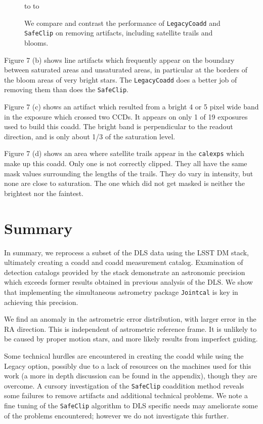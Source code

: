 \documentclass[DM,toc]{lsstdoc}
\def\gridline#1{\vskip6pt\hbox to\hsize{#1}\vskip6pt}
\def\fig#1#2#3{\hfill\vbox{\parskip=0pt\hsize=#2
\texttt{[image: \#1]}\vskip2pt\vtop{\centering
\footnotesize
\hsize=#2
#3\vskip1pt
}}\hfill}
\begin{document}
\begin{figure}
\gridline{\fig{fig1.png}{0.5\textwidth}{(a)}
          \fig{fig2.png}{0.5\textwidth}{(b)}
		}
\gridline{
		\fig{fig3.png}{0.5\textwidth}{(c)}
        \fig{fig5.png}{0.5\textwidth}{(d)}
	}
\caption{We compare and contrast the performance of {\tt\string LegacyCoadd} and {\tt\string SafeClip} on removing artifacts, including satellite trails and blooms.}
\end{figure}

Figure 7 (b) shows line artifacts which frequently appear on the boundary between saturated areas and unsaturated areas, in particular at the borders of the bloom areas of very bright stars. The {\tt\string LegacyCoadd} does a better job of removing them than does the {\tt\string SafeClip}.

Figure 7 (c) shows an artifact which resulted from a bright 4 or 5 pixel wide band in the exposure which crossed two CCDs. It appears on only 1 of 19 exposures used to build this coadd. The bright band is perpendicular to the readout direction, and is only about 1/3 of the saturation level.

Figure 7 (d) shows an area where satellite trails appear in the {\tt\string calexps} which make up this coadd. Only one is not correctly clipped. They all have the same mask values surrounding the lengths of the trails.  They do vary in intensity, but none are close to saturation. The one which did not get masked is neither the brightest nor the faintest.

\section{Summary}
In summary, we reprocess a subset of the DLS data using the LSST DM stack, ultimately creating a coadd and coadd measurement catalog. Examination of detection catalogs provided by the stack demonstrate an astronomic precision which exceeds former results obtained in previous analysis of the DLS. We show that implementing the simultaneous astrometry package {\tt\string Jointcal} is key in achieving this precision.

We find an anomaly in the astrometric error distribution, with larger error in the RA direction. This is independent of astrometric reference frame.  It is unlikely to be caused by proper motion stars, and more likely results from imperfect guiding.

Some technical hurdles are encountered in creating the coadd while using the Legacy option, possibly due to a lack of resources on the machines used for this work (a more in depth discussion can be found in the appendix), though they are overcome. A cursory investigation of the {\tt\string SafeClip} coaddition method reveals some failures to remove artifacts and additional technical problems. We note a fine tuning of the {\tt\string SafeClip} algorithm to DLS specific needs may ameliorate some of the problems encountered; however we do not investigate this further.
\end{document}
